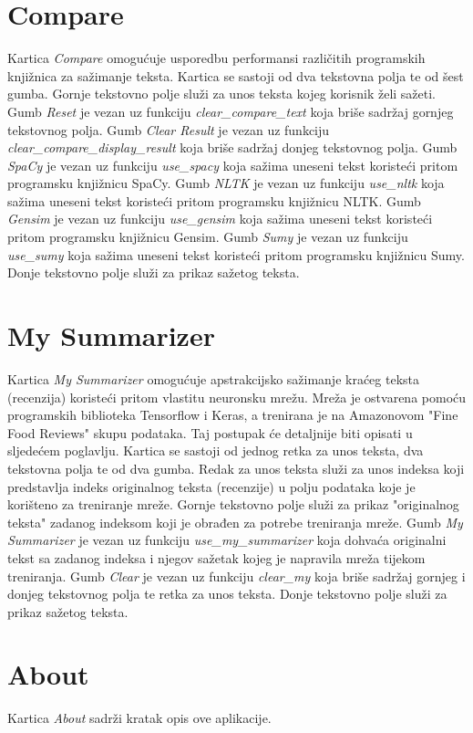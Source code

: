 \documentclass[times, utf8, zavrsni, numeric]{fer}
\begin{document}
\section{Compare}
Kartica \emph{Compare} omogućuje usporedbu performansi različitih programskih knjižnica za sažimanje teksta.
Kartica se sastoji od dva tekstovna polja te od šest gumba.
Gornje tekstovno polje služi za unos teksta kojeg korisnik želi sažeti.
Gumb \emph{Reset} je vezan uz funkciju \emph{clear\_compare\_text} koja briše sadržaj gornjeg tekstovnog polja.
Gumb \emph{Clear Result} je vezan uz funkciju \emph{clear\_compare\_display\_result} koja briše sadržaj donjeg tekstovnog polja.
Gumb \emph{SpaCy} je vezan uz funkciju \emph{use\_spacy} koja sažima uneseni tekst koristeći pritom programsku knjižnicu SpaCy.
Gumb \emph{NLTK} je vezan uz funkciju \emph{use\_nltk} koja sažima uneseni tekst koristeći pritom programsku knjižnicu NLTK.
Gumb \emph{Gensim} je vezan uz funkciju \emph{use\_gensim} koja sažima uneseni tekst koristeći pritom programsku knjižnicu Gensim.
Gumb \emph{Sumy} je vezan uz funkciju \emph{use\_sumy} koja sažima uneseni tekst koristeći pritom programsku knjižnicu Sumy.
Donje tekstovno polje služi za prikaz sažetog teksta.
\section{My Summarizer}
Kartica \emph{My Summarizer} omogućuje apstrakcijsko sažimanje kraćeg teksta (recenzija) koristeći pritom vlastitu neuronsku mrežu.
Mreža je ostvarena pomoću programskih biblioteka Tensorflow i Keras, a trenirana je na Amazonovom "Fine Food Reviews" skupu podataka. Taj postupak će detaljnije biti opisati u sljedećem poglavlju.
Kartica se sastoji od jednog retka za unos teksta, dva tekstovna polja te od dva gumba.
Redak za unos teksta služi za unos indeksa koji predstavlja indeks originalnog teksta (recenzije) u polju podataka koje je korišteno za treniranje mreže.
Gornje tekstovno polje služi za prikaz "originalnog teksta" zadanog indeksom koji je obrađen za potrebe treniranja mreže.
Gumb \emph{My Summarizer} je vezan uz funkciju \emph{use\_my\_summarizer} koja dohvaća originalni tekst sa zadanog indeksa i njegov sažetak kojeg je napravila mreža tijekom treniranja.
Gumb \emph{Clear} je vezan uz funkciju \emph{clear\_my} koja briše sadržaj gornjeg i donjeg tekstovnog polja te retka za unos teksta.
Donje tekstovno polje služi za prikaz sažetog teksta.
\section{About}
Kartica \emph{About} sadrži kratak opis ove aplikacije.
\end{document}

